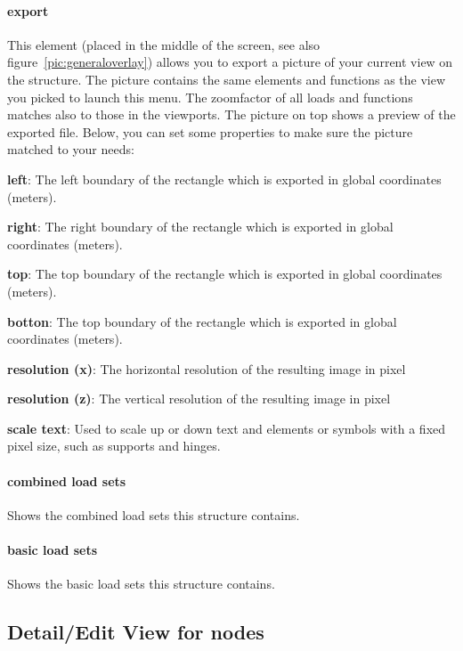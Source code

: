 \documentclass[a4paper,11pt]{report}
\begin{document}
\paragraph{export}
This element (placed in the middle of the screen, see also figure~\ref{pic:generaloverlay}) allows you to export a picture of your current view on the structure. The picture contains the same elements and functions as the view you picked to launch this menu. The zoomfactor of all loads and functions matches also to those in the viewports.
The picture on top shows a preview of the exported file. Below, you can set some properties to make sure the picture matched to your needs:
\begin{trivlist}
	\leftskip=1cm
	\item[]\textbf{left}: The left boundary of the rectangle which is exported in global coordinates (meters).
	\item[]\textbf{right}: The right boundary of the rectangle which is exported in global coordinates (meters).
	\item[]\textbf{top}: The top boundary of the rectangle which is exported in global coordinates (meters).
	\item[]\textbf{botton}: The top boundary of the rectangle which is exported in global coordinates (meters).
	\item[]\textbf{resolution (x)}: The horizontal resolution of the resulting image in pixel
	\item[]\textbf{resolution (z)}: The vertical resolution of the resulting image in pixel
	\item[]\textbf{scale text}: Used to scale up or down text and elements or symbols with a fixed pixel size, such as supports and hinges.
\end{trivlist}

\paragraph{combined load sets}
Shows the combined load sets this structure contains.

\paragraph{basic load sets}
Shows the basic load sets this structure contains.

\subsection{Detail/Edit View for nodes}
\label{sec:nodedetail}
\end{document}
